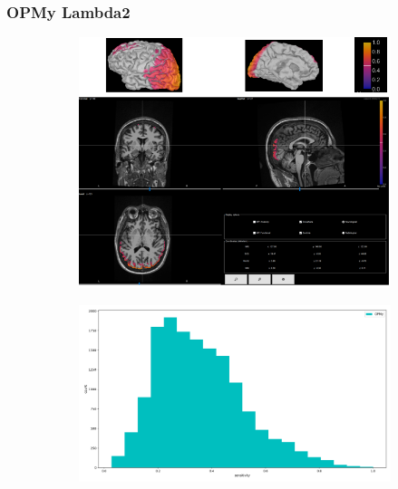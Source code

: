 \documentclass{beamer}
\numberwithin{figure}{section}
\numberwithin{equation}{section}
\begin{document}

\section{}
\begin{frame}
 \frametitle{OPMy Lambda2}
  

 	\begin{figure}[h]
        \begin{subfigure}[h]{0.53\linewidth} 
            \includegraphics[width=\linewidth]{pictures/OPMY2}
            \label{fig:rdf_graph}
        \end{subfigure}       
        \begin{subfigure}[h]{0.45\linewidth} 
            \includegraphics[width=\linewidth]{pictures/HISTopmy1}
            \label{fig:rdfs_graph}
        \end{subfigure}
    \end{figure}

  
\end{frame}
\end{document}
